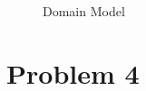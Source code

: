 \documentclass[a4paper,12pt]{report}
\begin{document}
\begin{figure}[!htb]
	\centering
	\caption{\label{fig:Domain Model} Domain Model}	
\end{figure}


%
%

\newpage

\FloatBarrier
\section{Problem 4}

\FloatBarrier
\end{document}
